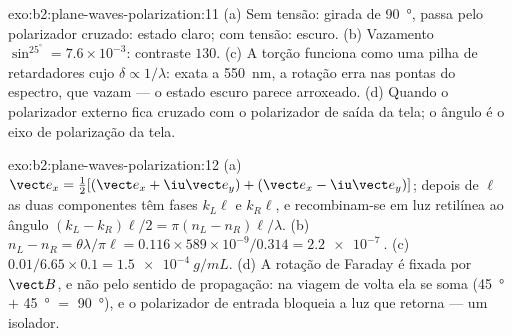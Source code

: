 \begin{solution}{exo:b2:plane-waves-polarization:11}
(a) Sem tensão: girada de \qty{90}{\degree}, passa pelo polarizador cruzado:
estado claro; com tensão: escuro. (b) Vazamento $\sin^25^\circ = 7.6 \times 10^{-3}$: contraste
$130$. (c) A torção funciona como uma pilha de retardadores cujo $\delta \propto 1/\lambda$:
exata a \qty{550}{nm}, a rotação erra nas pontas do espectro,
que vazam --- o estado escuro parece arroxeado. (d) Quando o
polarizador externo fica cruzado com o polarizador de saída da tela; o ângulo é
o eixo de polarização da tela.
\end{solution}

\begin{solution}{exo:b2:plane-waves-polarization:12}
(a) $\vect e_x = \tfrac12[(\vect e_x + \iu\vect e_y) + (\vect e_x - \iu\vect e_y)]$; depois de $\ell$
as duas componentes têm fases $k_L\ell$ e $k_R\ell$, e recombinam-se em
luz retilínea ao ângulo $(k_L - k_R)\ell/2 = \pi(n_L - n_R)\ell/\lambda$. (b) $n_L -
n_R = \theta\lambda/\pi\ell = 0.116 \times 589 \times 10^{-9}/0.314 = \qty{2.2e-7}{}$. (c)
$0.01/6.65 \times 0.1 = \qty{1.5e-4}{g/mL}$. (d) A rotação de Faraday é fixada por
$\vect B$, e não pelo sentido de propagação: na viagem de volta ela se soma
(\qty{45}{\degree} $+$ \qty{45}{\degree} $=$ \qty{90}{\degree}), e o polarizador de entrada bloqueia
a luz que retorna --- um isolador.
\end{solution}

